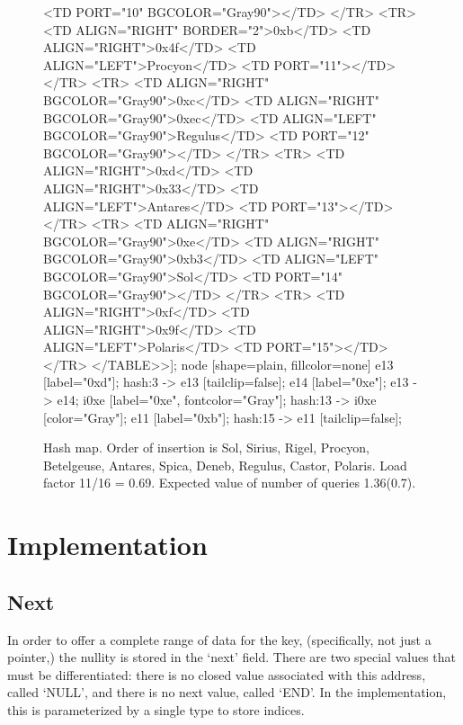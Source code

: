 \documentclass[12pt]{article}
\begin{document}
\begin{figure}
{		<TD PORT="10" BGCOLOR="Gray90">
	</TR>
	<TR>
		<TD ALIGN="RIGHT" BORDER="2">0xb</TD>
		<TD ALIGN="RIGHT">0x4f</TD>
		<TD ALIGN="LEFT">Procyon</TD>
		<TD PORT="11">
	</TR>
	<TR>
		<TD ALIGN="RIGHT" BGCOLOR="Gray90">0xc</TD>
		<TD ALIGN="RIGHT" BGCOLOR="Gray90">0xec</TD>
		<TD ALIGN="LEFT" BGCOLOR="Gray90">Regulus</TD>
		<TD PORT="12" BGCOLOR="Gray90">
	</TR>
	<TR>
		<TD ALIGN="RIGHT">0xd</TD>
		<TD ALIGN="RIGHT">0x33</TD>
		<TD ALIGN="LEFT">Antares</TD>
		<TD PORT="13">
	</TR>
	<TR>
		<TD ALIGN="RIGHT" BGCOLOR="Gray90">0xe</TD>
		<TD ALIGN="RIGHT" BGCOLOR="Gray90">0xb3</TD>
		<TD ALIGN="LEFT" BGCOLOR="Gray90">Sol</TD>
		<TD PORT="14" BGCOLOR="Gray90">
	</TR>
	<TR>
		<TD ALIGN="RIGHT">0xf</TD>
		<TD ALIGN="RIGHT">0x9f</TD>
		<TD ALIGN="LEFT">Polaris</TD>
		<TD PORT="15">
	</TR>
</TABLE>>];
	node [shape=plain, fillcolor=none]
	e13 [label="0xd"];
	hash:3 -> e13 [tailclip=false];
	e14 [label="0xe"];
	e13 -> e14;
	i0xe [label="0xe", fontcolor="Gray"];
	hash:13 -> i0xe [color="Gray"];
	e11 [label="0xb"];
	hash:15 -> e11 [tailclip=false];
	}
	\caption{Hash map.\label{star} Order of insertion is Sol, Sirius, Rigel, Procyon, Betelgeuse, Antares, Spica, Deneb, Regulus, Castor, Polaris. Load factor 11/16 = 0.69. Expected value of number of queries 1.36(0.7).}
\end{figure}

\section{Implementation}



\subsection{Next}

In order to offer a complete range of data for the key, (specifically, not just a pointer,) the nullity is stored in the `next' field. There are two special values that must be differentiated: there is no closed value associated with this address, called `NULL', and there is no next value, called `END'. In the implementation, this is parameterized by a single type to store indices.
\end{document}
